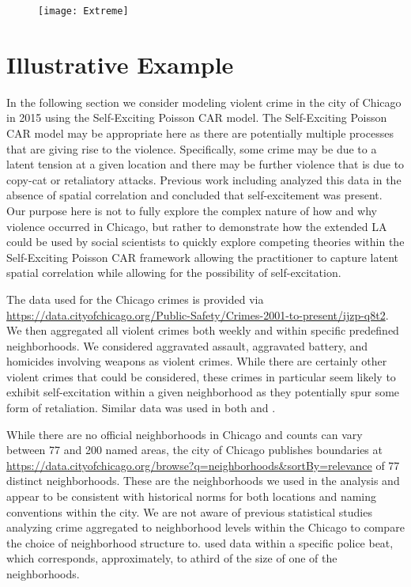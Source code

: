 \documentclass[11pt]{isuthesis}
\begin{document}
	\begin{figure}[!htp]
		\centering
		\texttt{[image: Extreme]}
		\label{fig:Extreme}
	\end{figure}
	
	\section{Illustrative Example}
	
	In the following section we consider modeling violent crime in the city of Chicago in 2015 using the Self-Exciting Poisson CAR model.  The Self-Exciting Poisson CAR model may be appropriate here as there are potentially multiple processes that are giving rise to the violence.  Specifically, some crime may be due to a latent tension at a given location and there may be further violence that is due to copy-cat or retaliatory attacks.  Previous work including \cite{mohler2013modeling} analyzed this data in the absence of spatial correlation and concluded that self-excitement was present.  Our purpose here is not to fully explore the complex nature of how and why violence occurred in Chicago, but rather to demonstrate how the extended LA could be used by social scientists to quickly explore competing theories within the Self-Exciting Poisson CAR framework allowing the practitioner to capture latent spatial correlation while allowing for the possibility of self-excitation.
	
	The data used for the Chicago crimes is provided via \url{https://data.cityofchicago.org/Public-Safety/Crimes-2001-to-present/ijzp-q8t2}.  We then aggregated all violent crimes both weekly and within specific predefined neighborhoods.  We considered aggravated assault, aggravated battery, and homicides involving weapons as violent crimes.  While there are certainly other violent crimes that could be considered, these crimes in particular seem likely to exhibit self-excitation within a given neighborhood as they potentially spur some form of retaliation.  Similar data was used in both \cite{mohler2013modeling} and \cite{mohler2014marked}. 
	
	While there are no official neighborhoods in Chicago and counts can vary between 77 and 200 named areas, the city of Chicago publishes boundaries at \url{https://data.cityofchicago.org/browse?q=neighborhoods&sortBy=relevance} of 77 distinct neighborhoods.  These are the neighborhoods we used in the analysis and appear to be consistent with historical norms for both locations and naming conventions within the city.  We are not aware of previous statistical studies analyzing crime aggregated to neighborhood levels within the Chicago to compare the choice of neighborhood structure to.  \cite{mohler2013modeling} used data within a specific police beat, which corresponds, approximately, to athird of the size of one of the neighborhoods.
	
\end{document}
